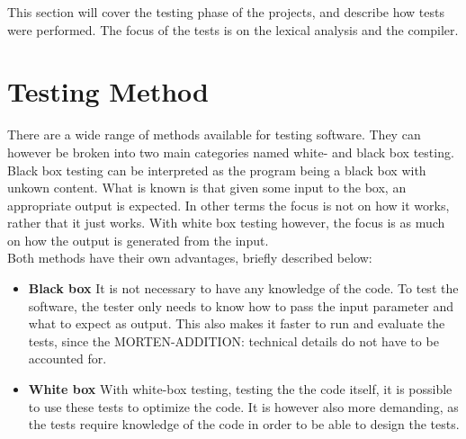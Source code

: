 This section will cover the testing phase of the projects, and describe how tests were performed. The focus of the tests is on the lexical analysis and the compiler.

\section{Testing Method}
There are a wide range of methods available for testing software. They can however be broken into two main categories named white- and black box testing. Black box testing can be interpreted as the program being a black box with unkown content. What is known is that given some input to the box, an appropriate output is expected. In other terms the focus is not on how it works, rather that it just works. With white box testing however, the focus is as much on how the output is generated from the input.\\

Both methods have their own advantages, briefly described below:
\begin{itemize}
\item[] \textbf{Black box} It is not necessary to have any knowledge of the code. To test the software, the tester only needs to know how to pass the input parameter and what to expect as output. This also makes it faster to run and evaluate the tests, since the MORTEN-ADDITION: technical details do not have to be accounted for.
\item[] \textbf{White box} With white-box testing, testing the the code itself, it is possible to use these tests to optimize the code. It is however also more demanding, as the tests require knowledge of the code in order to be able to design the tests. 
\end{itemize}

